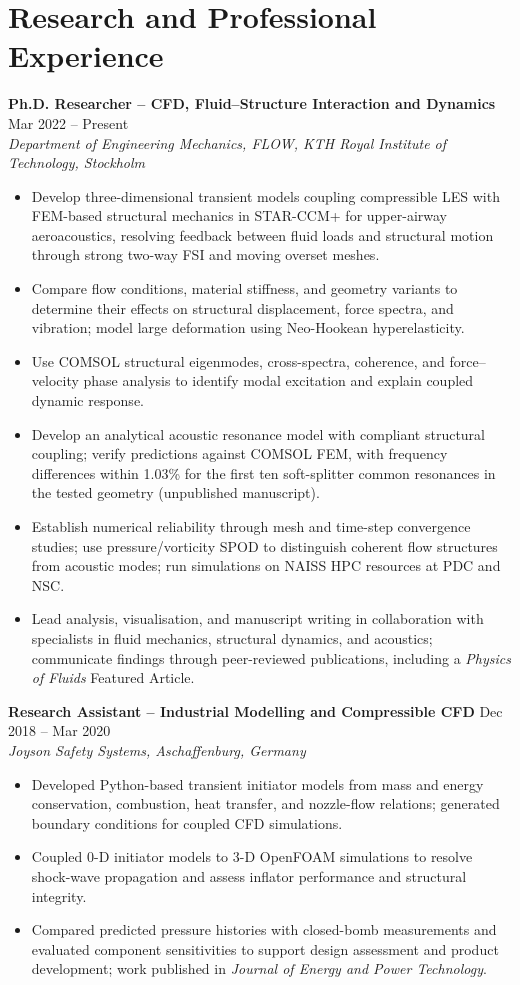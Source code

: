 \documentclass[a4paper,10pt]{article}
\begin{document}
\section{Research and Professional Experience}
\textbf{Ph.D. Researcher -- CFD, Fluid--Structure Interaction and Dynamics}
\hfill Mar 2022 -- Present\\
\textit{Department of Engineering Mechanics, FLOW, KTH Royal Institute of Technology, Stockholm}
\begin{itemize}
\item Develop three-dimensional transient models coupling compressible LES with FEM-based
structural mechanics in STAR-CCM+ for upper-airway aeroacoustics, resolving feedback between fluid loads and
structural motion through strong two-way FSI and moving overset meshes.
\item Compare flow conditions, material stiffness, and geometry variants to determine their
effects on structural displacement, force spectra, and vibration; model large deformation
using Neo-Hookean hyperelasticity.
\item Use COMSOL structural eigenmodes, cross-spectra, coherence, and force--velocity phase
analysis to identify modal excitation and explain coupled dynamic response.
\item Develop an analytical acoustic resonance model with compliant structural coupling;
verify predictions against COMSOL FEM, with frequency differences within 1.03\% for the
first ten soft-splitter common resonances in the tested geometry (unpublished manuscript).
\item Establish numerical reliability through mesh and time-step convergence studies;
use pressure/vorticity SPOD to distinguish coherent flow structures from acoustic modes;
run simulations on NAISS HPC resources at PDC and NSC.
\item Lead analysis, visualisation, and manuscript writing in collaboration with specialists in
fluid mechanics, structural dynamics, and acoustics; communicate findings through
peer-reviewed publications, including a \textit{Physics of Fluids} Featured Article.
\end{itemize}

\vspace{3pt}
\textbf{Research Assistant -- Industrial Modelling and Compressible CFD}
\hfill Dec 2018 -- Mar 2020\\
\textit{Joyson Safety Systems, Aschaffenburg, Germany}
\begin{itemize}
\item Developed Python-based transient initiator models from mass and energy conservation,
combustion, heat transfer, and nozzle-flow relations; generated boundary conditions for
coupled CFD simulations.
\item Coupled 0-D initiator models to 3-D OpenFOAM simulations to resolve shock-wave
propagation and assess inflator performance and structural integrity.
\item Compared predicted pressure histories with closed-bomb measurements and evaluated
component sensitivities to support design assessment and product development;
work published in \textit{Journal of Energy and Power Technology}.
\end{itemize}
\end{document}
